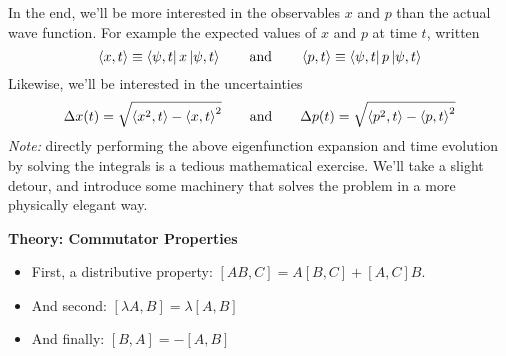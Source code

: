 \documentclass[11pt, a4paper]{article}
\newcommand{\eqtext}[1]{\qquad \text{#1} \qquad}
\begin{document}
\begin{itemize}
	In the end, we'll be more interested in the observables $ x $ and $ p $ than the actual wave function. For example the expected values of $ x $ and $ p $ at time $ t $, written
	\begin{equation*}
		\ev{x, t} \equiv \bra{\psi, t}x\ket{\psi, t} \eqtext{and} \ev{p, t} \equiv \bra{\psi, t}p\ket{\psi, t}
	\end{equation*}
	Likewise, we'll be interested in the uncertainties
	\begin{equation*}
		\Delta x(t) = \sqrt{\ev{x^{2}, t} - \ev{x, t}^{2}} \eqtext{and} \Delta p(t) = \sqrt{\ev{p^{2}, t} - \ev{p, t}^{2}}
	\end{equation*}
	\textit{Note:} directly performing the above eigenfunction expansion and time evolution by solving the integrals is a tedious mathematical exercise. We'll take a slight detour, and introduce some machinery that solves the problem in a more physically elegant way.
\end{itemize}

\textbf{Theory: Commutator Properties}
\begin{itemize}
	\item First, a distributive property: $ [AB, C] = A[B, C] + [A, C]B $.
	
	\item And second: $ [\lambda A, B] = \lambda [A, B] $
	
	\item And  finally: $ [B, A] = -[A, B] $
\end{itemize}
\end{document}

